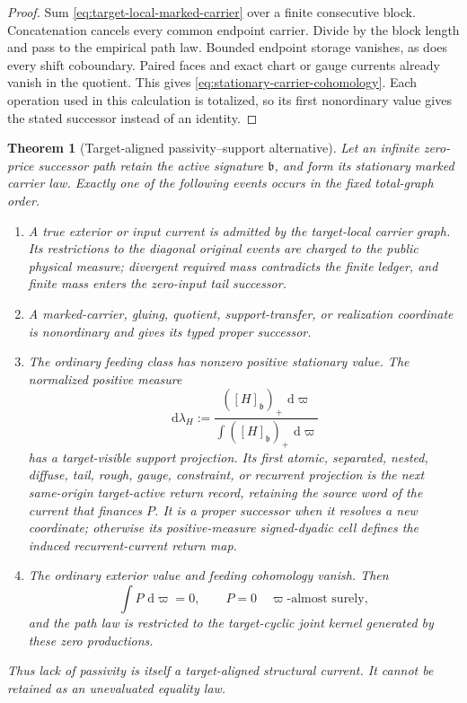 \documentclass[11pt]{article}
\numberwithin{section}{part}
\theoremstyle{plain}
\newtheorem{theorem}{Theorem}[section]
\theoremstyle{definition}
\theoremstyle{remark}
\newcommand{\dd}{\,\mathrm d}
\begin{document}
\begin{proof}
Sum \eqref{eq:target-local-marked-carrier} over a finite consecutive block.
Concatenation cancels every common endpoint carrier.  Divide by the block
length and pass to the empirical path law.  Bounded endpoint storage vanishes,
as does every shift coboundary.  Paired faces and exact chart or gauge currents
already vanish in the quotient.  This gives
\eqref{eq:stationary-carrier-cohomology}.  Each operation used in this
calculation is totalized, so its first nonordinary value gives the stated
successor instead of an identity.
\end{proof}

\begin{theorem}[Target-aligned passivity--support alternative]
\label{thm:target-aligned-passivity-support}
Let an infinite zero-price successor path retain the active signature
\(\mathfrak b\), and form its stationary marked carrier law.  Exactly one of
the following events occurs in the fixed total-graph order.
\begin{enumerate}[label=\textup{(V\arabic*)}]
\item A true exterior or input current is admitted by the target-local
carrier graph.  Its restrictions to the diagonal original events are charged
to the public physical measure; divergent required mass contradicts the
finite ledger, and finite mass enters the zero-input tail successor.
\item A marked-carrier, gluing, quotient, support-transfer, or realization
coordinate is nonordinary and gives its typed proper successor.
\item The ordinary feeding class has nonzero positive stationary value.  The
normalized positive measure
\begin{equation}
 \label{eq:positive-feeding-support-law}
 \dd\lambda_H
 :=\frac{([H]_{\mathfrak b})_+\,\dd\varpi}
         {\int([H]_{\mathfrak b})_+\,\dd\varpi}
\end{equation}
has a target-visible support projection.  Its first atomic, separated,
nested, diffuse, tail, rough, gauge, constraint, or recurrent projection is
the next same-origin target-active return record, retaining the source word
of the current that finances \(P\).  It is a proper successor when it resolves
a new coordinate; otherwise its positive-measure signed-dyadic cell defines
the induced recurrent-current return map.
\item The ordinary exterior value and feeding cohomology vanish.  Then
\begin{equation}
 \label{eq:terminal-passivity-zero-production}
 \int P\,\dd\varpi=0,
 \qquad P=0\quad\varpi\text{-almost surely},
\end{equation}
and the path law is restricted to the target-cyclic joint kernel generated by
these zero productions.
\end{enumerate}
Thus lack of passivity is itself a target-aligned structural current.  It
cannot be retained as an unevaluated equality law.
\end{theorem}
\end{document}
